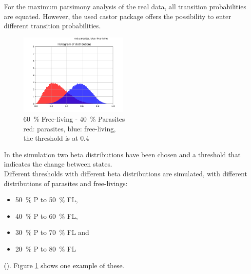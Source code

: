       For the maximum parsimony analysis of the real data, all transition probabilities are equated.
        However, the used castor package \cite{Louca2017} offers the possibility to enter different 
        transition probabilities.
      \begin{figure}
        \begin{center}
          \includegraphics[trim = 0mm 0mm 0mm 15mm, clip, width=0.48\textwidth]{Figures/40-60.png}
        \end{center}
        \caption{60~\% Free-living - 40~\% Parasites \\ red: parasites, blue: free-living, \\ the threshold is at 0.4}
        \label{fig:Beta distribution}
      \end{figure}

      In the simulation two beta distributions have been chosen and a threshold that indicates the change 
        between states. \\
      Different thresholds with different beta distributions are simulated, with different distributions 
        of parasites and free-livings:
        \begin{itemize}
          \item 50~\% P to 50~\% FL,
          \item 40~\% P to 60~\% FL,
          \item 30~\% P to 70~\% FL and 
          \item 20~\% P to 80~\% FL
        \end{itemize}
        (). Figure \ref{fig:Beta distribution} 
        shows one example of these. \\

